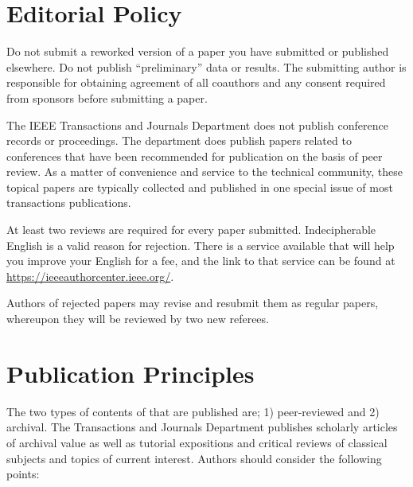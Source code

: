 \documentclass[journal]{IEEEtranTIE}
\begin{document}
\section{Editorial Policy}

Do not submit a reworked version of a paper you have submitted or published elsewhere. Do not publish ``preliminary'' data or results. The submitting author is responsible for obtaining agreement of all coauthors and any consent required from sponsors before submitting a paper.

The IEEE Transactions and Journals Department does not publish conference records or proceedings. The department  does publish papers related to conferences that have been recommended for publication on the basis of peer review. As a matter of convenience and service to the technical community, these topical papers are typically collected and published in one special issue of most transactions publications.

At least two reviews are required for every paper submitted. Indecipherable English is a valid reason for rejection. There is a service available that will help you improve your English for a fee, and the link to that service can be found at \url{https://ieeeauthorcenter.ieee.org/}.

Authors of rejected papers may revise and resubmit them as regular papers, whereupon they will be reviewed by two new referees.

\section{Publication Principles}

The two types of contents of that are published are; 1) peer-reviewed and 2) archival. The Transactions and Journals Department publishes scholarly articles of archival value as well as tutorial expositions and critical reviews of classical subjects and topics of current interest.
Authors should consider the following points:
\end{document}
